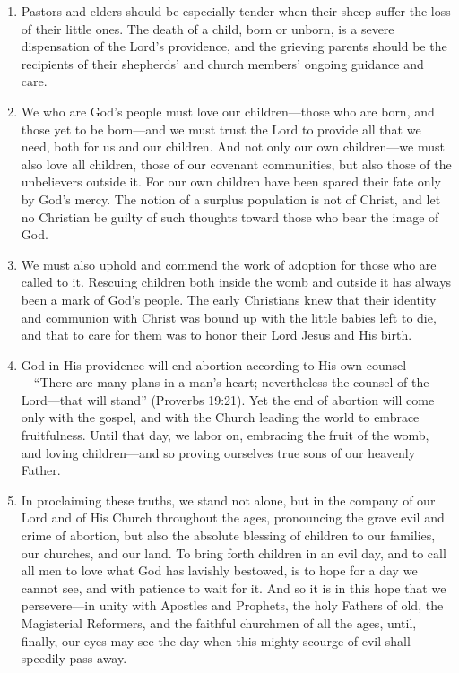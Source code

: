 \documentclass[
]{book}
\begin{document}
\begin{enumerate}
\item
  Pastors and elders should be especially tender when their sheep suffer the loss of their little ones. The death of a child, born or unborn, is a severe dispensation of the Lord's providence, and the grieving parents should be the recipients of their shepherds' and church members' ongoing guidance and care.
\item
  We who are God's people must love our children---those who are born, and those yet to be born---and we must trust the Lord to provide all that we need, both for us and our children. And not only our own children---we must also love all children, those of our covenant communities, but also those of the unbelievers outside it. For our own children have been spared their fate only by God's mercy. The notion of a surplus population is not of Christ, and let no Christian be guilty of such thoughts toward those who bear the image of God.
\item
  We must also uphold and commend the work of adoption for those who are called to it. Rescuing children both inside the womb and outside it has always been a mark of God's people. The early Christians knew that their identity and communion with Christ was bound up with the little babies left to die, and that to care for them was to honor their Lord Jesus and His birth.
\item
  God in His providence will end abortion according to His own counsel---``There are many plans in a man's heart; nevertheless the counsel of the Lord---that will stand'' (Proverbs 19:21). Yet the end of abortion will come only with the gospel, and with the Church leading the world to embrace fruitfulness. Until that day, we labor on, embracing the fruit of the womb, and loving children---and so proving ourselves true sons of our heavenly Father.
\item
  In proclaiming these truths, we stand not alone, but in the company of our Lord and of His Church throughout the ages, pronouncing the grave evil and crime of abortion, but also the absolute blessing of children to our families, our churches, and our land. To bring forth children in an evil day, and to call all men to love what God has lavishly bestowed, is to hope for a day we cannot see, and with patience to wait for it. And so it is in this hope that we persevere---in unity with Apostles and Prophets, the holy Fathers of old, the Magisterial Reformers, and the faithful churchmen of all the ages, until, finally, our eyes may see the day when this mighty scourge of evil shall speedily pass away.
\end{enumerate}
\end{document}
